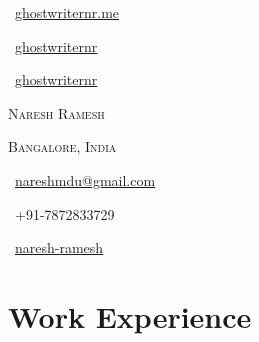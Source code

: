 \documentclass[a4paper,10pt]{extarticle} %
\begin{document}
\pagestyle{empty} %


\begin{center}
\begin{minipage}[b]{0.33333\textwidth}
\raggedright
\faGlobe\ {\href{https://ghostwriternr.me/}{ghostwriternr.me}}\par
\faGithub\ {\href{https://github.com/ghostwriternr}{ghostwriternr}}\par
\faGitlab\ {\href{https://gitlab.com/ghostwriternr}{ghostwriternr}}
\end{minipage}%
\begin{minipage}[b]{0.33333\textwidth}
\centering
\Huge\textsc{\textcolor{primary}{Naresh} Ramesh}\par
\normalsize{\textsc{Bangalore, India}}
\end{minipage}%
\begin{minipage}[b]{0.33333\textwidth}
\raggedleft
\normalsize\faEnvelope\ {\href{mailto:nareshmdu@gmail.com}{nareshmdu@gmail.com}}\par
\faPhone\ +91-7872833729\par
\faLinkedinSquare\ {\href{https://www.linkedin.com/in/naresh-ramesh}{naresh-ramesh}}
\phantom{ }
\end{minipage}
\end{center}


\section{\textcolor{primary}{Work Experience}}
\end{document}
